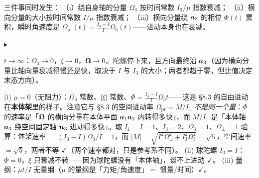 \documentclass[11pt]{ctexart}
\newcommand{\step}[1]{\par\vspace{3pt}\noindent
  {\color{violet}\small$\blacktriangleright$}\hspace{3pt}{\bfseries\color{violetdeep}#1}\par\vspace{1pt}}
\begin{document}

三件事同时发生：
（i）绕自身轴的分量 $\Omega_3$ 按时间常数 $I_3/\mu$ 指数衰减；
（ii）横向分量的大小按时间常数 $I/\mu$ 指数衰减；
（iii）横向分量绕 $\boldsymbol{a}_3$ 的相位 $\Phi(t)$ 累积，瞬时角速度是 $\Omega_{\text{pr}}(t)=\frac{I_3-I}{I}\Omega_3(t)$——进动本身也在衰减。

\step{极限}
$t\to\infty$：$\Omega_3\to0$，$\xi\to0$，$\boldsymbol{\Omega}\to0$。陀螺停下来，且方向最终沿 $\boldsymbol{a}_3$（因为横向分量比轴向量衰减得慢还是快，取决于 $I$ 与 $I_3$ 的大小；两者都趋于零，但比值决定末态方向）。

(i) $\mu=0$（无阻力）：$\Omega_3$ 常数、$|\xi|$ 常数、$\Phi=\frac{I_3-I}{I}\Omega_3t$——这是 \S8.3 的自由进动在\textbf{本体架}里的样子。注意它与 \S8.3 的空间进动率 $\Omega_{\text{pr}}=M/I_1$ \emph{不是同一个量}：$\Phi$ 的速率是「$\boldsymbol{\Omega}$ 的横向分量在本体平面 $\boldsymbol{a}_1\boldsymbol{a}_2$ 内转得多快」，而 $M/I_1$ 是「本体轴 $\boldsymbol{a}_3$ 绕空间固定轴 $\boldsymbol{n}_3$ 进动得多快」。取 $I_1=I=1$、$I_3=2$、$\Omega_3=1$、$\Omega_\perp=1$ 验算：体架速率 $=(I_3-I)\Omega_3/I=1$，而 $|M|=\sqrt{I^2\Omega_\perp^2+I_3^2\Omega_3^2}=\sqrt5$，空间速率 $=\sqrt5$，两者不等 $\checkmark$（两个速率都对，只是参考系不同）。
(ii) 球陀螺 $I_3=I$：$\Phi=0$，$\xi$ 只衰减不转——因为球陀螺没有「本体轴」，谈不上进动 $\checkmark$。
(iii) 量纲：$\mu t/I$ 无量纲（$\mu$ 的量纲是「力矩/角速度」$=$ 惯量/时间）$\checkmark$。

\flowerrule

\end{document}
